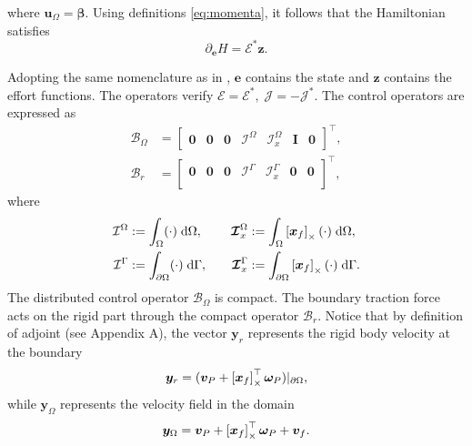 where $\bm{u}_\Omega = \bm\beta$. Using definitions  \eqref{eq:momenta}, it follows that the Hamiltonian  satisfies 
\begin{equation}
\label{eq:gradH}
\partial_{\bm{e}} H = \bm{\mathcal{E}}^* \bm{z}.
\end{equation}

Adopting the same nomenclature as in \cite{mehrmann2019structurepreserving}, $\bm{e}$ contains the state and $\bm{z}$ contains the effort functions. The operators verify $\mathcal{E} = \mathcal{E}^*, \; \mathcal{J} = -\mathcal{J}^*$. The control operators are expressed as
\begin{align*}
\mathcal{B}_\Omega &= 
\begin{bmatrix}
\bm{0} & \bm{0} & \bm{0} & \mathcal{I}^\Omega & \bm{\mathcal{I}}_{x}^\Omega & \bm{I} & \bm{0}
\end{bmatrix}^\top, \\
\mathcal{B}_r &= 
\begin{bmatrix}
\bm{0} & \bm{0} & \bm{0} & \mathcal{I}^{\Gamma} & \bm{\mathcal{I}}_{x}^{\Gamma} & \bm{0} & \bm{0} \\
\end{bmatrix}^\top,
\end{align*}
where 
\begin{equation*}
\begin{aligned}
\mathcal{I}^\Omega &:=\int_{\Omega} (\cdot) \d{\Omega}, \\
\mathcal{I}^{\Gamma} &:= \int_{\partial \Omega} (\cdot) \d{\Gamma}, \\
\end{aligned} \qquad
\begin{aligned} 
\bm{\mathcal{I}}_{x}^\Omega &:=\int_{\Omega} \crmat{\bm{x}_f} (\cdot) \d{\Omega}, \\
\bm{\mathcal{I}}_{x}^{\Gamma} &:=\int_{\partial \Omega} \crmat{\bm{x}_f} (\cdot) \d{\Gamma}. \\
\end{aligned}
\end{equation*}
The distributed control operator $\mathcal{B}_\Omega$  is compact. The boundary traction force acts on the rigid part through the compact operator $\mathcal{B}_r$. Notice that by definition of adjoint (see Appendix A), the vector $\bm{y}_r$ represents the rigid body velocity at the boundary
\[
\bm{y}_r = (\bm{v}_P + \left[\bm{x}_f\right]_\times^\top \bm{\omega}_P)\vert_{\partial\Omega},
\] 
while $\bm{y}_\Omega$ represents the velocity field in the domain
\[
\bm{y}_\Omega = \bm{v}_P + \left[\bm{x}_f\right]_\times^\top \bm{\omega}_P + \bm{v}_f.
\]
